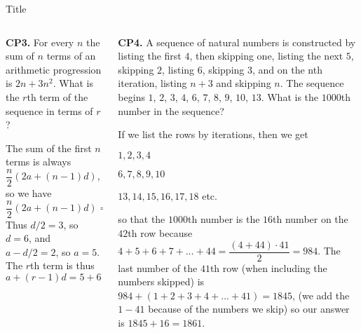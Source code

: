 \documentclass[9pt,aspectratio=169]{beamer}
\begin{document}
\begin{frame}{Title}
  \begin{columns}[T]
    \begin{column}{0.5\textwidth}
      \begin{problem}
        \textbf{CP3.} For every $n$ the sum of $n$ terms of an arithmetic progression is $2n + 3n^2$. What is the $r$th term of
        the sequence in terms of $r$?
      \end{problem}
      The sum of the first $n$ terms is always $\dfrac{n}{2} (2a + (n-1)d)$, so we have 
      \[ \frac{n}{2}(2a + (n-1)d)=an + dn^2/2 -dn/2. \]
      Thus $d/2 = 3$, so $d = 6$, and $a-d/2 = 2$, so $a=5$. The $r$th term is thus
      \[ a + (r-1)d = 5+6(r-1)=\boxed{6r-1}. \]
    \end{column}
    \begin{column}{0.5\textwidth}
      \begin{problem}
        \textbf{CP4.} A sequence of natural numbers is constructed by listing the first
        $4$, then skipping one, listing the next $5$, skipping $2$, listing $6$, skipping $3$, and on the nth
        iteration, listing $n + 3$ and skipping $n$. The sequence begins $1$, $2$, $3$, $4$, $6$, $7$, $8$, $9$, $10$, $13$.
        What is the $1000$th number in the sequence?
      \end{problem}
      If we list the rows by iterations, then we get

      $1,2,3,4$

      $6,7,8,9,10$

      $13,14,15,16,17,18$ etc.

      so that the $1000$th number is the $16$th number on the $42$th row because $4+5+6+7+\dots+44 = \dfrac{(4+44)\cdot 41}{2}=984$. The last number of the $41$th row (when including the numbers skipped) is $984 + (1+2+3+4+\dots+41)= 1845$, (we add the $1-41$ because of the numbers we skip) so our answer is $1845 + 16 = \boxed{1861}$.
    \end{column}
  \end{columns}
\end{frame}

\end{document}
